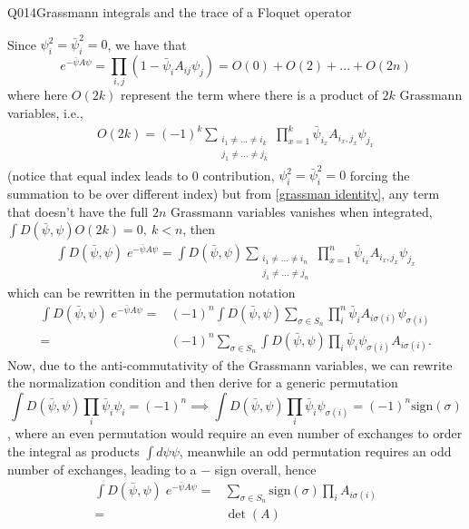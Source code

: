 \begin{entry}{Q014}{Grassmann integrals and the trace of a Floquet operator}
\begin{solution}[Part (a)]
Since $\psi_i^{2}=\bar\psi_i^{2}=0$, we have that 
\begin{equation}
    e^{-\bar\psi A\psi}= \prod_{i,j}(1 -  \bar\psi_i A_{ij}\psi_j)=O(0)+O(2)+...+O(2n)
\end{equation}
where here $O(2k)$ represent the term where there is a product of $2k$ Grassmann variables, i.e.,
\begin{equation*}
\begin{split}
    O(2k)= (-1)^k\sum_{\substack{i_1\neq...\neq i_k\\j_1\neq...\neq j_k}} \prod_{x=1}^{k}\bar\psi_{i_x}A_{i_x,j_x}\psi_{j_x}
\end{split}
\end{equation*}
(notice that equal index leads to 0 contribution, $\psi_i^{2}=\bar\psi_i^{2}=0$ forcing the summation to be over different index) but from \eqref{grassman identity}, any term that doesn't have the full $2n$ Grassmann variables vanishes when integrated, $\int D(\bar\psi,\psi) O(2k)=0,\ k<n$, then 
\begin{equation}
\begin{split}
    \int D(\bar\psi,\psi)\; e^{-\bar\psi A\psi} = \int D(\bar\psi,\psi) \sum_{\substack{i_1\neq...\neq i_n\\j_1\neq...\neq j_n}} \prod_{x=1}^{n}\bar\psi_{i_x}A_{i_x,j_x}\psi_{j_x}
\end{split}
\end{equation}
which can be rewritten in the permutation notation 
\begin{equation}
\begin{split}
    \int D(\bar\psi,\psi)\; e^{-\bar\psi A\psi} =& (-1)^n\int D(\bar\psi,\psi) \sum_{\sigma \in S_n} \prod_i^n \bar\psi_i A_{i\sigma(i)}\psi_{\sigma(i)}\\
    =& (-1)^n\sum_{\sigma \in S_n}\int D(\bar\psi,\psi)\prod_i\bar\psi_i \psi_{\sigma(i)}A_{i \sigma(i)}.
\end{split}
\end{equation}
Now, due to the anti-commutativity of the Grassmann variables, we can rewrite the normalization condition and then derive for a generic permutation
\begin{equation}
   \int D(\bar\psi,\psi)\prod_i\bar\psi_i \psi_{i} =(-1)^n\implies\int D(\bar\psi,\psi)\prod_i\bar\psi_i \psi_{\sigma(i)}=(-1)^n\text{sign}(\sigma)
\end{equation}, where an even permutation would require an even number of exchanges to order the integral as products $\int d \psi \psi$, meanwhile an odd permutation requires an odd number of exchanges, leading to a $-$ sign overall, hence
\begin{equation}
\begin{split}
    \int D(\bar\psi,\psi)\; e^{-\bar\psi A\psi}
    =&\sum_{\sigma \in S_n}\text{sign}(\sigma)\prod_iA_{i \sigma(i)}\\
    =& \det (A
)\end{split}
\end{equation}
\end{solution}


\end{entry}
